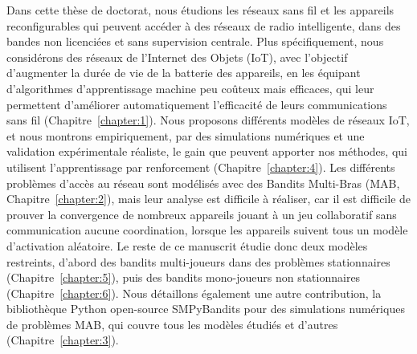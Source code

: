 \begin{resume_fr}





Dans cette thèse de doctorat, nous étudions les réseaux sans fil et les appareils reconfigurables qui peuvent accéder à des réseaux de radio intelligente, dans des bandes non licenciées et sans supervision centrale.
Plus spécifiquement, nous considérons des réseaux de l'Internet des Objets (IoT), avec l'objectif d'augmenter la durée de vie de la batterie des appareils, en les équipant d'algorithmes d'apprentissage machine peu coûteux mais efficaces, qui leur permettent d'améliorer automatiquement l'efficacité de leurs communications sans fil (Chapitre~\ref{chapter:1}).
Nous proposons différents modèles de réseaux IoT, et nous montrons empiriquement, par des simulations numériques et une validation expérimentale réaliste, le gain que peuvent apporter nos méthodes, qui utilisent l'apprentissage par renforcement (Chapitre~\ref{chapter:4}).
Les différents problèmes d'accès au réseau sont modélisés avec des Bandits Multi-Bras (MAB, Chapitre~\ref{chapter:2}), mais leur analyse est difficile à réaliser,
car il est difficile de prouver la convergence de nombreux appareils jouant à un jeu collaboratif sans communication aucune coordination, lorsque les appareils suivent tous un modèle d'activation aléatoire.
Le reste de ce manuscrit étudie donc deux modèles restreints, d'abord des bandits multi-joueurs dans des problèmes stationnaires (Chapitre~\ref{chapter:5}), puis des bandits mono-joueurs non stationnaires (Chapitre~\ref{chapter:6}).
Nous détaillons également une autre contribution, la bibliothèque Python open-source SMPyBandits pour des simulations numériques de problèmes MAB, qui couvre tous les modèles étudiés et d'autres (Chapitre~\ref{chapter:3}).



\end{resume_fr}
